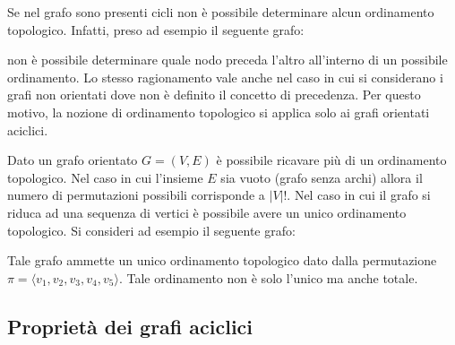 \begin{osservation}
		Se nel grafo sono presenti cicli non è possibile determinare alcun ordinamento topologico. Infatti, preso ad esempio il seguente grafo:
	\begin{center}
	\end{center}
	non è possibile determinare quale nodo preceda l'altro all'interno di un possibile ordinamento. Lo stesso ragionamento vale anche nel caso in cui si considerano i grafi non orientati dove non è definito il concetto di precedenza. Per questo motivo, la nozione di ordinamento topologico si applica solo ai grafi orientati aciclici.
\end{osservation}


\begin{osservation}
		Dato un grafo orientato $G=(V,E)$ è possibile ricavare più di un ordinamento topologico. Nel caso in cui l'insieme $E$ sia vuoto (grafo senza archi) allora il numero di permutazioni possibili corrisponde a $|V|!$. Nel caso in cui il grafo si riduca ad una sequenza di vertici è possibile avere un unico ordinamento topologico. Si consideri ad esempio il seguente grafo:
	\begin{center}
	\end{center}
	Tale grafo ammette un unico ordinamento topologico dato dalla permutazione $\pi=\langle v_{1},v_{2},v_{3},v_{4},v_{5} \rangle$. Tale ordinamento non è solo l'unico ma anche totale.
\end{osservation}

\subsection{Proprietà dei grafi aciclici}



